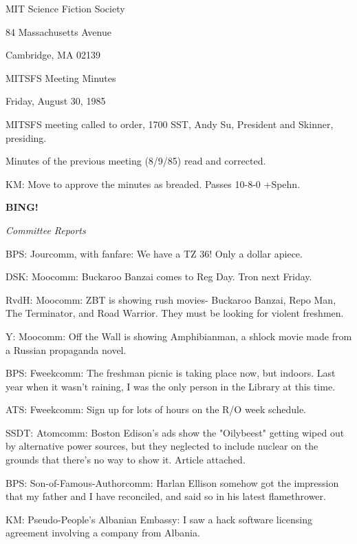 \documentclass[12pt]{article}
\newcommand{\bing}{{\bf BING!} }
\newcommand{\goto}[1]{\bing \vskip 12pt \centerline{{\em{#1}}}}
\begin{document}
\begin{center}

MIT Science Fiction Society 

84 Massachusetts Avenue

Cambridge, MA 02139

\vspace{12pt}

MITSFS Meeting Minutes 

Friday, August 30, 1985

\end{center}
 
\vspace{18pt}

\setlength{\parskip}{6pt}

\noindent
MITSFS meeting called to order, 1700 SST,
Andy Su, President and Skinner, presiding.

Minutes of the previous meeting (8/9/85) read and corrected.

KM: Move to approve the minutes as breaded. Passes 10-8-0 +Spehn.

\goto{Committee Reports}

BPS: Jourcomm, with fanfare: We have a TZ 36! Only a dollar apiece.

DSK: Moocomm: Buckaroo Banzai comes to Reg Day. Tron next Friday.

RvdH: Moocomm: ZBT is showing rush movies- Buckaroo Banzai, Repo Man, The Terminator, and Road Warrior. They must be looking for violent freshmen.

Y: Moocomm: Off the Wall is showing Amphibianman, a shlock movie made from a Russian propaganda novel.

BPS: Fweekcomm: The freshman picnic is taking place now, but indoors. Last year when it wasn't raining, I was the only person in the Library at this time.

ATS: Fweekcomm: Sign up for lots of hours on the R/O week schedule.

SSDT: Atomcomm: Boston Edison's ads show the "Oilybeest" getting wiped out by alternative power sources, but they neglected to include nuclear on the grounds that there's no way to show it. Article attached.

BPS: Son-of-Famous-Authorcomm: Harlan Ellison somehow got the impression that my father and I have reconciled, and said so in his latest flamethrower.

KM: Pseudo-People's Albanian Embassy: I saw a hack software licensing agreement involving a company from Albania.
\end{document}

